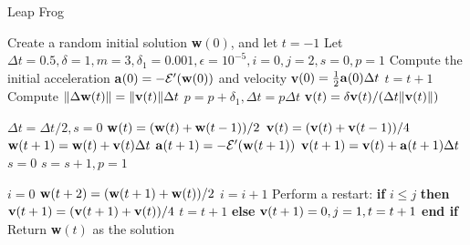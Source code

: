\documentclass[10pt, conference]{IEEEtran}
\begin{document}
\begin{algorithm}[h!]
    \caption{Leap Frog}
    \label{alg:LeapFrog_algorithm}
    \begin{algorithmic}[1]
        \State Create a random initial solution \textbf{w}$(0)$, and let $t = -1$
        \State Let $\Delta t = 0.5, \delta = 1, m = 3, \delta_1 = 0.001, \epsilon = 10^{-5}, i = 0, j = 2, s = 0, p = 1$
        \State Compute the initial acceleration \textbf{a}$(0) = -\mathcal{E}'(\text{\textbf{w}}(0))$ and velocity
                \textbf{v}$(0) = \frac{1}{2}\text{\textbf{a}}(0)\Delta t$
        \Repeat
            \State $t = t + 1$
            \State Compute $\| \Delta \text{\textbf{w}}(t) \| = \|\text{\textbf{v}}(t) \| \Delta t$
                \State $p = p + \delta_1, \Delta t = p \Delta t$
            \Else
                \State \textbf{v}$(t) = \delta \text{\textbf{v}}(t)/(\Delta t \| \text{\textbf{v}}(t) \|)$
            \EndIf

                \State $\Delta t = \Delta t / 2, s = 0$
                \State \textbf{w}$(t) = (\text{\textbf{w}}(t) + \text{\textbf{w}}(t-1))/2$
                \State $\text{\textbf{v}}(t) = (\text{\textbf{v}}(t) + \text{\textbf{v}}(t-1))/4$
            \EndIf
            \State $\text{\textbf{w}}(t+1) = \text{\textbf{w}}(t) + \text{\textbf{v}}(t) \Delta t$
            \Repeat
                \State $\text{\textbf{a}}(t+1) = -\mathcal{E}'(\text{\textbf{w}}(t+1))$
                \State $\text{\textbf{v}}(t+1) = \text{\textbf{v}}(t) + \text{\textbf{a}}(t+1) \Delta t$
                    \State $s = 0$
                \Else
                    \State $s = s + 1, p = 1$
                \EndIf

                        \State $i = 0$
                    \Else
                        \State $\text{\textbf{w}}(t+2) = (\text{\textbf{w}}(t+1) + \text{\textbf{w}}(t))/2$
                        \State $i = i + 1$
                        \State Perform a restart: \textbf{if} $i \leq j$ \textbf{then}
                        \State \quad $\text{\textbf{v}}(t+1) = (\text{\textbf{v}}(t+1) + \text{\textbf{v}}(t))/4$
                        \State \quad $t = t + 1$
                        \State \textbf{else}
                        \State \quad $\text{\textbf{v}}(t+1) = 0, j = 1, t = t + 1$
                        \State \textbf{end if}
                    \EndIf
                \EndIf
        \State Return \textbf{w}$(t)$ as the solution
    \end{algorithmic}
\end{algorithm}
\end{document}
